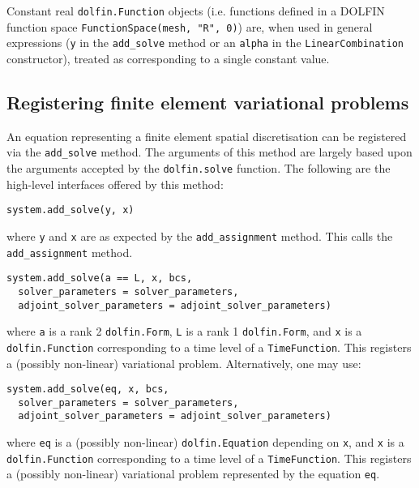 \documentclass[a4paper]{book}
\begin{document}
Constant real \verb+dolfin.Function+ objects (i.e. functions defined in a
DOLFIN function space \verb+FunctionSpace(mesh, "R", 0)+) are, when used in
general expressions (\verb+y+ in the \verb+add_solve+ method or an \verb+alpha+
in the \verb+LinearCombination+ constructor), treated as corresponding to a
single constant value.

\subsection{Registering finite element variational problems}

An equation representing a finite element spatial discretisation can be
registered via the \verb+add_solve+ method. The arguments of this method are
largely based upon the arguments accepted by the \verb+dolfin.solve+ function.
The following are the high-level interfaces offered by this method:

\begin{lstlisting}
system.add_solve(y, x)
\end{lstlisting}
where \verb+y+ and \verb+x+ are as expected by the \verb+add_assignment+ method.
This calls the \verb+add_assignment+ method.

\begin{lstlisting}
system.add_solve(a == L, x, bcs,
  solver_parameters = solver_parameters,
  adjoint_solver_parameters = adjoint_solver_parameters)
\end{lstlisting}
where \verb+a+ is a rank 2 \verb+dolfin.Form+, \verb+L+ is a rank 1 \linebreak
\verb+dolfin.Form+, and \verb+x+ is a \verb+dolfin.Function+ corresponding to a
time level of a \linebreak \verb+TimeFunction+. This registers a (possibly
non-linear) variational problem. Alternatively, one may use:
\begin{lstlisting}
system.add_solve(eq, x, bcs,
  solver_parameters = solver_parameters,
  adjoint_solver_parameters = adjoint_solver_parameters)
\end{lstlisting}
where \verb+eq+ is a (possibly non-linear) \verb+dolfin.Equation+ depending on
\verb+x+, and \verb+x+ is a \verb+dolfin.Function+ corresponding to a time level
of a \verb+TimeFunction+. This registers a (possibly non-linear) variational
problem represented by the equation \verb+eq+.
\end{document}
